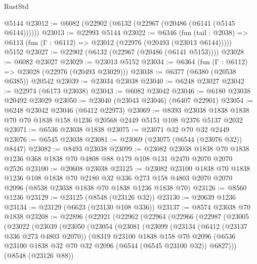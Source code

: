 \begin{lexlean}{RustStd}
\begin{coremodule}
    @5144
@23012 := @6082 (@22902 (@6132 (@22967 (@20486 (@6141 (@5145 @6144))))))
@23013 := @22993 @5144
@23022 := @6346
    (fun (tail : @2038) => @6113 (fun (Γ : @6112) => @23012 (@22976 (@20493 (@23013 @6144)))))
    @5152
@23027 := @22902 (@6132 (@22967 (@20486 (@6141 @5153))))
@23028 := @6082 @23027
@23029 := @23013 @5152
@23034 := @6364 (fun (Γ : @6112) => @23028 (@22976 (@20493 @23029)))
@23038 := @6377 (@6380 (@20538 @6385)) @20542
@23039 := @23034 @23038
@23040 := @6248 @23027
@23042 := @22974 (@6173 @23038)
@23043 := @6082 @23042
@23046 := @6180 @23038 @20492 @23029
@23050 := @23040 (@23043 @23046) (@6407 @22901)
@23054 := @6248 @23042 @23046 (@6412 @22973)
@23069 := @8393
    @23038
    @1838
    @1838
    @70
    @70
    @1838
    @158
    @1236
    @20568
    @2449
    @5151
    @108
    @2376
    @5137
    @2032
@23071 := @6536 @23038 @1838
@23075 := @23071 @32 @70 @32 @2449
@23076 := @6545 @23038
@23081 := @23069 (@23075 (@6544 (@23076 @32)) @8447)
@23082 := @8493 @23038
@23099 := @23082
    @23038
    @1838
    @70
    @1838
    @1236
    @368
    @1838
    @70
    @4808
    @88
    @179
    @108
    @131
    @2470
    @2070
    @2070
    @2526
@23100 := @20608 @23038
@23125 := @23082
    @23100
    @1838
    @70
    @1838
    @1236
    @108
    @1838
    @70
    @2180
    @32
    @336
    @273
    @158
    @4803
    @2070
    @2070
    @2096
    (@8538 @23038 @1838 @70 @1838 @1236 @1838 @70)
@23126 := @8560 @1236
@23129 := @23125 (@8548 (@23126 @32))
@23130 := @20639 @1236
@23134 := @23129 (@6623 (@23130 @108 @336))
@23137 := @8574 @23038 @70 @1838
@23208 := @22896
    (@22921
      (@22962
        (@22964
          (@22966
            (@22987
              (@23005
                (@23022
                  (@23039
                    (@23050
                      (@23054
                        (@23081
                          (@23099
                            (@23134
                              (@6412 (@23137 @336 @273 @4803 @2070))
                              (@8319
                                @23100
                                @1838
                                @158
                                @70
                                @2096
                                (@6536
                                  @23100
                                  @1838
                                  @32
                                  @70
                                  @32
                                  @2096
                                  (@6544 (@6545 @23100 @32))
                                  @6827)))
                            (@8548 (@23126 @88))

\end{coremodule}
\end{lexlean}
